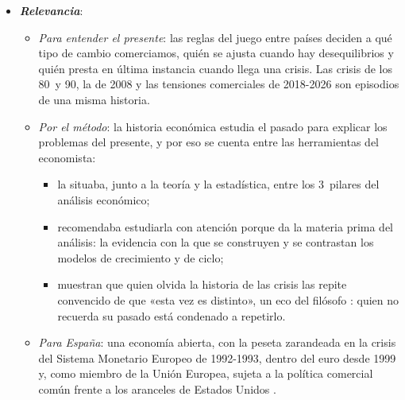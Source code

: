 \documentclass[11pt]{article}
\begin{document}
\begin{itemize}
\item \textbf{\emph{Relevancia}}:
  \begin{itemize}
  \item \emph{Para entender el presente}: las reglas del juego entre países deciden a qué tipo de cambio comerciamos, quién se ajusta cuando hay desequilibrios y quién presta en última instancia cuando llega una crisis. Las crisis de los 80~y 90, la de 2008 y las tensiones comerciales de 2018-2026 son episodios de una misma historia.
  \item \emph{Por el método}: la historia económica estudia el pasado para explicar los problemas del presente, y por eso se cuenta entre las herramientas del economista:
    \begin{itemize}
    \item {} la situaba, junto a la teoría y la estadística, entre los 3~pilares del análisis económico;
    \item {} recomendaba estudiarla con atención porque da la materia prima del análisis: la evidencia con la que se construyen y se contrastan los modelos de crecimiento y de ciclo;
    \item \textcite{ReinhartRogoff2009This} muestran que quien olvida la historia de las crisis las repite convencido de que «esta vez es distinto», un eco del filósofo : quien no recuerda su pasado está condenado a repetirlo.
    \end{itemize}
  \item \emph{Para España}: una economía abierta, con la peseta zarandeada en la crisis del Sistema Monetario Europeo de 1992-1993, dentro del euro desde 1999 y, como miembro de la Unión Europea, sujeta a la política comercial común frente a los aranceles de Estados Unidos  .
  \end{itemize}


\end{itemize}
\end{document}

